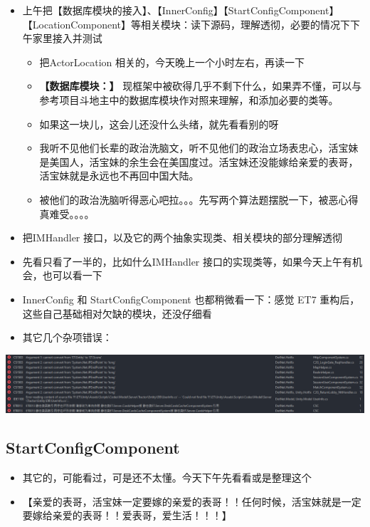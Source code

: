 \documentclass[9pt, b5paper]{article}
\begin{document}
\begin{itemize}
\item 上午把【数据库模块的接入】、【InnerConfig】【StartConfigComponent】【LocationComponent】等相关模块：读下源码，理解透彻，必要的情况下下午家里接入并测试
\begin{itemize}
\item 把ActorLocation 相关的，今天晚上一个小时左右，再读一下
\item \textbf{【数据库模块：】} 现框架中被砍得几乎不剩下什么，如果弄不懂，可以与参考项目斗地主中的数据库模块作对照来理解，和添加必要的类等。
\item 如果这一块儿，这会儿还没什么头绪，就先看看别的呀
\item 我听不见他们长辈的政治洗脑文，听不见他们的政治立场表忠心，活宝妹是美国人，活宝妹的余生会在美国度过。活宝妹还没能嫁给亲爱的表哥，活宝妹就是永远也不再回中国大陆。
\item 被他们的政治洗脑听得恶心吧拉。。。先写两个算法题摆脱一下，被恶心得真难受。。。。
\end{itemize}
\item 把IMHandler 接口，以及它的两个抽象实现类、相关模块的部分理解透彻
\item 先看只看了一半的，比如什么IMHandler 接口的实现类等，如果今天上午有机会，也可以看一下
\item InnerConfig 和 StartConfigComponent 也都稍微看一下：感觉 ET7 重构后，这些自己基础相对欠缺的模块，还没仔细看

\item 其它几个杂项错误：
\end{itemize}

\begin{center}
\includegraphics[width=.9\linewidth]{./pic/et4_20230616_165627.png}
\end{center}
\subsection{StartConfigComponent}
\label{sec:org81517d1}
\begin{itemize}
\item 其它的，可能看过，可是还不太懂。今天下午先看看或是整理这个
\item 【亲爱的表哥，活宝妹一定要嫁的亲爱的表哥！！任何时候，活宝妹就是一定要嫁给亲爱的表哥！！爱表哥，爱生活！！！】
\end{itemize}
\end{document}
